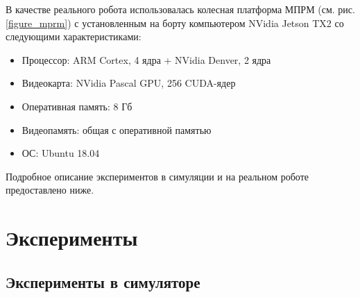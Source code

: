 \documentclass{mipt-thesis-ms}
\begin{document}
 	В качестве реального робота использовалась колесная платформа МПРМ (см. рис. \ref{figure_mprm}) с установленным на борту компьютером NVidia Jetson TX2 со следующими характеристиками:
 	
 	\begin{itemize}
 		\item Процессор: ARM Cortex, 4 ядра + NVidia Denver, 2 ядра
 		\item Видеокарта: NVidia Pascal GPU, 256 CUDA-ядер
 		\item Оперативная память: 8 Гб
 		\item Видеопамять: общая с оперативной памятью
 		\item ОС: Ubuntu 18.04
 	\end{itemize}
 
 	Подробное описание экспериментов в симуляции и на реальном роботе предоставлено ниже.
	
	\section{Эксперименты}
	
	\subsection{Эксперименты в симуляторе}
	\label{section_experiments}
	
\end{document}
